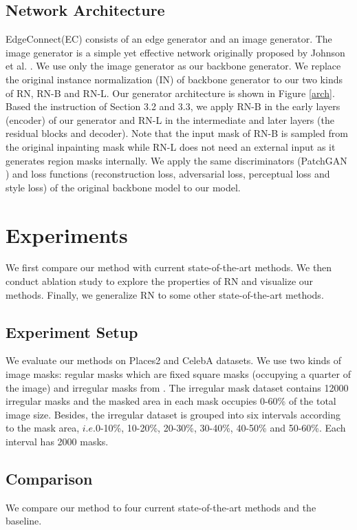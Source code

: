 \documentclass[letterpaper]{article} %
\begin{document}
\subsection{Network Architecture}
EdgeConnect(EC) \cite{nazeri2019edgeconnect} consists of an edge generator and an image generator. The image generator is a simple yet effective network originally proposed by Johnson et al. \cite{johnson2016perceptual}. We use only the image generator as our backbone generator. We replace the original instance normalization (IN) of backbone generator to our two kinds of RN, RN-B and RN-L. Our generator architecture is shown in Figure \ref{arch}. Based the instruction of Section 3.2 and 3.3, we apply RN-B in the early layers (encoder) of our generator and RN-L in the intermediate and later layers (the residual blocks and decoder). Note that the input mask of RN-B is sampled from the original inpainting mask while RN-L does not need an external input as it generates region masks internally. We apply the same discriminators (PatchGAN \cite{isola2017image,zhu2017unpaired}) and loss functions (reconstruction loss, adversarial loss, perceptual loss and style loss) of the original backbone model to our model.



\section{Experiments}
We first compare our method with current state-of-the-art methods. We then conduct ablation study to explore the properties of RN and visualize our methods. Finally, we generalize RN to some other state-of-the-art methods.


\subsection{Experiment Setup}
We evaluate our methods on Places2 \cite{zhou2017places} and CelebA \cite{liu2015deep} datasets. We use two kinds of image masks: regular masks which are fixed square masks (occupying a quarter of the image) and irregular masks from \cite{liu2018image}. The irregular mask dataset contains 12000 irregular masks and the masked area in each mask occupies 0-60\% of the total image size. Besides, the irregular dataset is grouped into six intervals according to the mask area, $i.e.$0-10\%, 10-20\%, 20-30\%, 30-40\%, 40-50\% and 50-60\%. Each interval has 2000 masks.


\subsection{Comparison}
We compare our method to four current state-of-the-art methods and the baseline.
\end{document}
